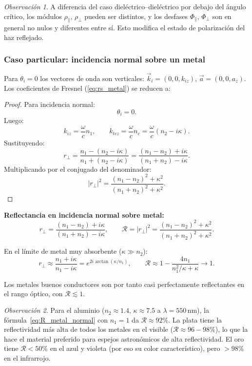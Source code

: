 \documentclass[12pt, a4paper]{article}
\theoremstyle{plain}
\theoremstyle{definition}
\theoremstyle{remark}
\newtheorem*{observacion}{Observación}
\newcommand{\ve}[1]{\vec{#1}}
\begin{document}
\begin{observacion}
A diferencia del caso dieléctrico--dieléctrico por debajo del ángulo crítico,
los módulos $\rho_\parallel$, $\rho_\perp$ pueden ser distintos, y los
desfases $\Phi_\parallel$, $\Phi_\perp$ son en general no nulos y diferentes
entre sí. Esto modifica el estado de polarización del haz reflejado.
\end{observacion}

\subsubsection{Caso particular: incidencia normal sobre un metal}

Para $\theta_i = 0$ los vectores de onda son verticales:
$\ve{k}_i = (0, 0, k_{iz})$, $\ve{a} = (0, 0, a_z)$.
Los coeficientes de Fresnel (\ref{eq:rs_metal}) se reducen a:

\begin{proof}
Para incidencia normal:
\[
  \theta_i = 0.
\]
Luego:
\[
  k_{iz} = \frac{\omega}{c}n_1,
  \qquad
  k_{tcz} = \frac{\omega}{c}n_c
          = \frac{\omega}{c}(n_2 - i\kappa).
\]
Sustituyendo:
\[
  r_\perp = \frac{n_1 - (n_2 - i\kappa)}{n_1 + (n_2 - i\kappa)}
           = \frac{(n_1 - n_2) + i\kappa}{(n_1 + n_2) - i\kappa}.
\]
Multiplicando por el conjugado del denominador:
\[
  |r_\perp|^2
  =\frac{(n_1-n_2)^2+\kappa^2}{(n_1+n_2)^2+\kappa^2}.
\]
\end{proof}

\begin{mdframed}[style=resultado]
\textbf{Reflectancia en incidencia normal sobre metal:}
\begin{equation}
  r_\perp = \frac{(n_1 - n_2) + i\kappa}{(n_1 + n_2) - i\kappa},
  \qquad
  \mathcal{R} = |r_\perp|^2 = \frac{(n_1 - n_2)^2 + \kappa^2}
                                    {(n_1 + n_2)^2 + \kappa^2}.
  \label{eq:R_metal_normal}
\end{equation}
\end{mdframed}

En el límite de metal muy absorbente ($\kappa \gg n_2$):
\[
  r_\perp \approx \frac{n_1 + i\kappa}{n_1 - i\kappa}
  = e^{2i\arctan(\kappa/n_1)},
  \qquad
  \mathcal{R} \approx 1 - \frac{4n_1}{n_1^2/\kappa + \kappa} \to 1.
\]

Los metales buenos conductores son por tanto casi perfectamente reflectantes
en el rango óptico, con $\mathcal{R} \lesssim 1$.

\begin{observacion}
Para el aluminio ($n_2 \approx 1.4$, $\kappa \approx 7.5$ a $\lambda =
550\,\text{nm}$), la fórmula~\eqref{eq:R_metal_normal} con $n_1 = 1$ da
$\mathcal{R} \approx 92\%$. La plata tiene la reflectividad más alta de
todos los metales en el visible ($\mathcal{R} \approx 96{-}98\%$), lo que
la hace el material preferido para espejos astronómicos de alta
reflectividad. El oro tiene $\mathcal{R} < 50\%$ en el azul y violeta
(por eso su color característico), pero $> 98\%$ en el infrarrojo.
\end{observacion}
\end{document}
